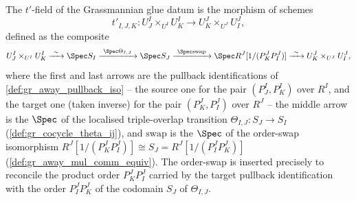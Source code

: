 \begin{definition}

  \label{def:gr_chart_transition'}
  The \(t'\)-field of the Grassmannian glue datum is the morphism of schemes
  \[
    t'_{I,J,K} : U^I_J \times_{U^I} U^I_K \longrightarrow U^J_K \times_{U^J} U^J_I ,
  \]
  defined as the composite
  \[
    U^I_J \times_{U^I} U^I_K
      \xrightarrow{\ \sim\ } \Spec S_I
      \xrightarrow{\ \Spec \Theta_{I,J}\ } \Spec S_J
      \xrightarrow{\ \Spec \mathrm{swap}\ } \Spec R^J[1/(P^J_K P^J_I)]
      \xrightarrow{\ \sim\ } U^J_K \times_{U^J} U^J_I ,
  \]
  where the first and last arrows are the pullback identifications of
  \cref{def:gr_away_pullback_iso} -- the source one for the pair \((P^I_J, P^I_K)\)
  over \(R^I\), and the target one (taken inverse) for the pair \((P^J_K, P^J_I)\)
  over \(R^J\) -- the middle arrow is the \(\Spec\) of the localised
  triple-overlap transition \(\Theta_{I,J} : S_J \to S_I\)
  (\cref{def:gr_cocycle_theta_ij}), and \(\mathrm{swap}\) is the \(\Spec\) of the
  order-swap isomorphism \(R^J[1/(P^J_K P^J_I)] \cong S_J = R^J[1/(P^J_I P^J_K)]\)
  (\cref{def:gr_away_mul_comm_equiv}). The order-swap is inserted precisely to
  reconcile the product order \(P^J_K P^J_I\) carried by the target pullback
  identification with the order \(P^J_I P^J_K\) of the codomain \(S_J\) of
  \(\Theta_{I,J}\).
\end{definition}

